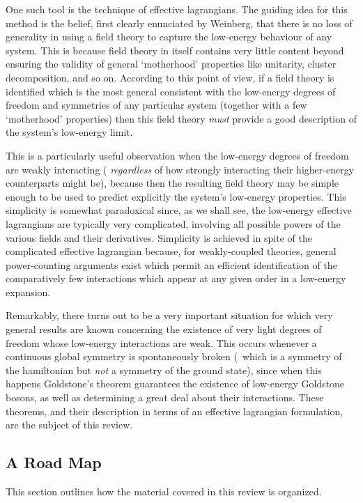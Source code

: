 \documentclass[12pt,epsf]{report}
\begin{document}
One such tool is the technique of effective lagrangians.
The guiding idea for this method is the belief, first
clearly enunciated by Weinberg, that there is no loss of
generality in using a field theory to capture the
low-energy behaviour of any system. This is because field
theory in itself contains very little content beyond
ensuring the validity of general `motherhood' properties
like unitarity, cluster decomposition, and so on. 
According to this point of view, if a field theory is
identified which is the most general consistent with the
low-energy degrees of freedom and symmetries of any
particular system (together with a few `motherhood'
properties) then this field theory {\it must} provide a
good description of the system's low-energy limit.

This is a particularly useful observation when the
low-energy degrees of freedom are weakly interacting ({\it
regardless} of how strongly interacting their higher-energy
counterparts might be), because then the resulting field
theory may be simple enough to be used to predict
explicitly the system's low-energy properties. This
simplicity is somewhat paradoxical since, as we shall see,
the low-energy effective lagrangians are typically very
complicated, involving all possible powers of the various
fields and their derivatives. Simplicity is achieved in
spite of the complicated effective lagrangian because, for
weakly-coupled theories, general power-counting arguments
exist which permit an efficient identification of the
comparatively few interactions which appear at any given
order in a low-energy expansion.

Remarkably, there turns out to be a very important
situation for which very general results are known
concerning the existence of very light degrees of freedom
whose low-energy interactions are weak. This occurs
whenever a continuous global symmetry is spontaneously
broken (\ie\ which is a symmetry of the hamiltonian but
{\em not} a symmetry of the ground state), since when this
happens Goldstone's theorem guarantees the existence of
low-energy Goldstone bosons, as well as determining a great
deal about their interactions. These theorems, and their
description in terms of an effective lagrangian
formulation, are the subject of this review.

\subsection{A Road Map}

This section outlines how the material covered in this
review is organized.
\end{document}
